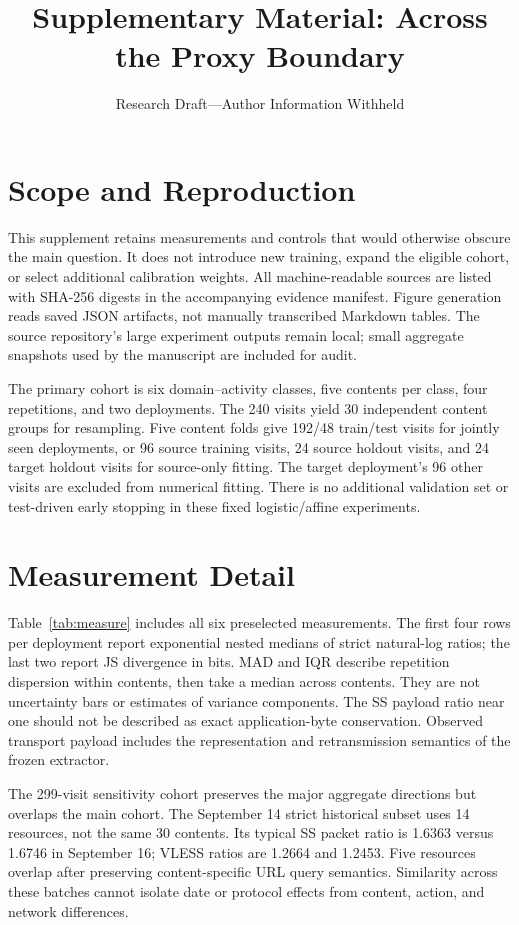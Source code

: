 \documentclass[journal]{IEEEtran}
\title{Supplementary Material: Across the Proxy Boundary}
\author{Research Draft---Author Information Withheld}
\begin{document}
\raggedbottom\maketitle
\section{Scope and Reproduction}
This supplement retains measurements and controls that would otherwise obscure the main question. It does not introduce new training, expand the eligible cohort, or select additional calibration weights. All machine-readable sources are listed with SHA-256 digests in the accompanying evidence manifest. Figure generation reads saved JSON artifacts, not manually transcribed Markdown tables. The source repository's large experiment outputs remain local; small aggregate snapshots used by the manuscript are included for audit.

The primary cohort is six domain--activity classes, five contents per class, four repetitions, and two deployments. The 240 visits yield 30 independent content groups for resampling. Five content folds give 192/48 train/test visits for jointly seen deployments, or 96 source training visits, 24 source holdout visits, and 24 target holdout visits for source-only fitting. The target deployment's 96 other visits are excluded from numerical fitting. There is no additional validation set or test-driven early stopping in these fixed logistic/affine experiments.

\section{Measurement Detail}
Table~\ref{tab:measure} includes all six preselected measurements. The first four rows per deployment report exponential nested medians of strict natural-log ratios; the last two report JS divergence in bits. MAD and IQR describe repetition dispersion within contents, then take a median across contents. They are not uncertainty bars or estimates of variance components. The SS payload ratio near one should not be described as exact application-byte conservation. Observed transport payload includes the representation and retransmission semantics of the frozen extractor.
\begin{table}[t]\centering\caption{Primary-cohort transformation summaries.}\label{tab:measure}\small\end{table}

The 299-visit sensitivity cohort preserves the major aggregate directions but overlaps the main cohort. The September 14 strict historical subset uses 14 resources, not the same 30 contents. Its typical SS packet ratio is 1.6363 versus 1.6746 in September 16; VLESS ratios are 1.2664 and 1.2453. Five resources overlap after preserving content-specific URL query semantics. Similarity across these batches cannot isolate date or protocol effects from content, action, and network differences.
\end{document}
